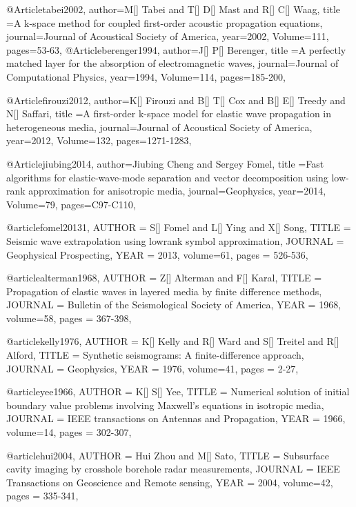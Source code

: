 @Article{tabei2002,
  author={M[] Tabei and T[] D[] Mast and R[] C[] Waag},
  title ={A k-space method for coupled first-order acoustic propagation equations},
  journal={Journal of Acoustical Society of America},
  year=2002,
  Volume=111,
  pages={53-63},
}
@Article{berenger1994,
  author={J[] P[] Berenger},
  title ={A perfectly matched layer for the absorption of electromagnetic waves},
  journal={Journal of Computational Physics},
  year=1994,
  Volume=114,
  pages={185-200},
}

@Article{firouzi2012,
  author={K[] Firouzi and B[] T[] Cox and B[] E[] Treedy and N[] Saffari},
  title ={A first-order k-space model for elastic wave propagation in heterogeneous media},
  journal={Journal of Acoustical Society of America},
  year=2012,
  Volume=132,
  pages={1271-1283},
}


@Article{jiubing2014,
  author={Jiubing Cheng and Sergey Fomel},
  title ={Fast algorithms for elastic-wave-mode separation and vector decomposition using low-rank approximation for anisotropic media},
  journal={Geophysics},
  year=2014,
  Volume=79,
  pages={C97-C110},
}

@article{fomel20131,
  AUTHOR =       {S[] Fomel and L[] Ying and X[] Song},
  TITLE =        {Seismic wave extrapolation using lowrank symbol approximation},
  JOURNAL =      {Geophysical Prospecting},
  YEAR =         {2013},
  volume=61,
  pages = {526-536},
}

@article{alterman1968,
  AUTHOR =       {Z[] Alterman and F[] Karal},
  TITLE =        {Propagation of elastic waves in layered media by finite difference methods},
  JOURNAL =      {Bulletin of the Seismological Society of America},
  YEAR =         {1968},
  volume=58,
  pages = {367-398},
}

@article{kelly1976,
  AUTHOR =       {K[] Kelly and R[] Ward and S[] Treitel and R[] Alford},
  TITLE =        {Synthetic seismograms: A finite-difference approach},
  JOURNAL =      {Geophysics},
  YEAR =         {1976},
  volume=41,
  pages = {2-27},
}

@article{yee1966,
  AUTHOR =       {K[] S[] Yee},
  TITLE =        {Numerical solution of initial boundary value problems involving Maxwell's equations in isotropic media},
  JOURNAL =      {IEEE transactions on Antennas and Propagation},
  YEAR =         {1966},
  volume=14,
  pages = {302-307},
}

@article{hui2004,
  AUTHOR =       {Hui Zhou and M[] Sato},
  TITLE =        {Subsurface cavity imaging by crosshole borehole radar measurements},
  JOURNAL =      {IEEE Transactions on Geoscience and Remote sensing},
  YEAR =         {2004},
  volume=42,
  pages = {335-341},
}



